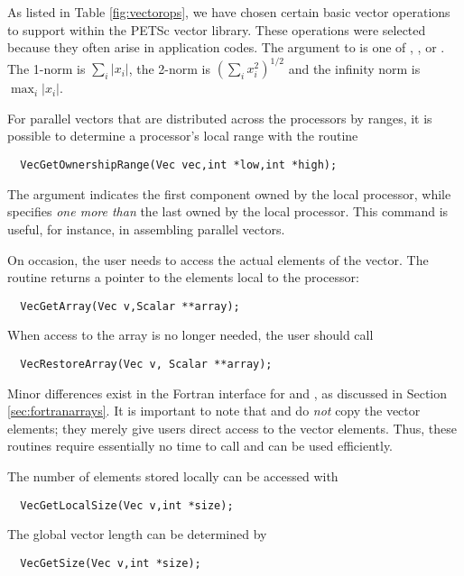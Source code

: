 As listed in Table \ref{fig:vectorops}, we have chosen certain 
basic vector operations to support within the PETSc vector library.
These operations were selected because they often arise in application 
codes. The  argument to  is one of 
 , , or .
   
  The 1-norm is 
$ \sum_i |x_{i}|$, the 2-norm is $( \sum_{i} x_{i}^{2})^{1/2} $ and the 
infinity norm is $ \max_{i} |x_{i}|$. 


For parallel vectors that are distributed across the processors by ranges, 
it is possible to determine 
a processor's local range with the routine
\begin{verbatim}
  VecGetOwnershipRange(Vec vec,int *low,int *high);
\end{verbatim}
The argument  indicates the first component owned by the local 
processor, while  specifies {\em one more than} the 
last owned by the local processor.
This command is useful, for instance, in assembling parallel vectors.

On occasion, the user needs to access the actual elements of the vector. 
The routine  
returns a pointer to the elements local to the processor:
\begin{verbatim}
  VecGetArray(Vec v,Scalar **array);
\end{verbatim}
When access to the array is no longer
needed, the user should call
\begin{verbatim}
  VecRestoreArray(Vec v, Scalar **array);
\end{verbatim}
Minor differences exist in the Fortran interface for  and 
, as discussed in Section \ref{sec:fortranarrays}.  
It is important to note that  and 
do {\em not} copy the vector elements; they merely give users direct
access to the vector elements. Thus, these routines require essentially
no time to call and can be used efficiently.

The number of elements stored locally can be accessed with
\begin{verbatim}
  VecGetLocalSize(Vec v,int *size);
\end{verbatim}
The global vector length can be determined by 
\begin{verbatim}
  VecGetSize(Vec v,int *size);
\end{verbatim}


